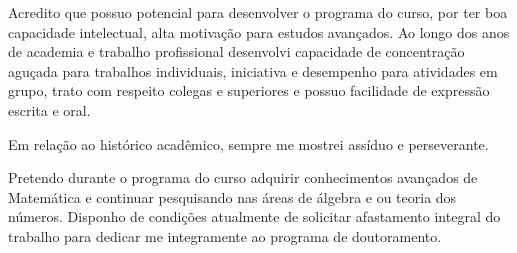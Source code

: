 \documentclass[11pt]{article}
\begin{document}
Acredito que possuo potencial para desenvolver o programa do curso, por ter boa capacidade intelectual, alta motivação para estudos avançados. Ao longo dos anos de academia e trabalho profissional desenvolvi capacidade de concentração aguçada para trabalhos individuais, iniciativa e desempenho para atividades em grupo, trato com respeito  colegas e superiores e possuo facilidade de expressão escrita e oral. 

Em relação ao histórico acadêmico, sempre me mostrei assíduo e perseverante.

Pretendo durante o programa do curso adquirir conhecimentos avançados de Matemática e continuar pesquisando nas áreas de álgebra e ou teoria dos números. Disponho de condições atualmente de solicitar afastamento integral do trabalho para dedicar me integramente ao programa de doutoramento. 
\end{document}
